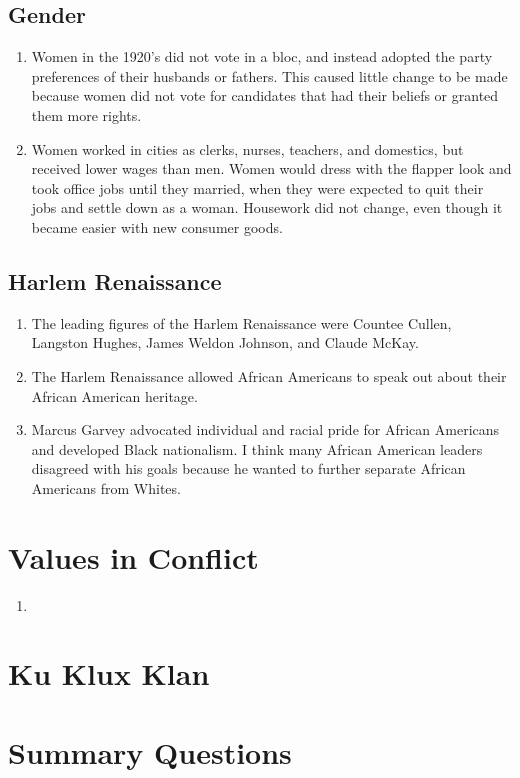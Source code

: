 \documentclass[12pt]{article} %
\begin{document}
\subsection{Gender}
\begin{enumerate}[resume]
	\item Women in the 1920's did not vote in a bloc, and instead adopted the party preferences of their
		husbands or fathers. This caused little change to be made because women did not vote for candidates
		that had their beliefs or granted them more rights.
	\item Women worked in cities as clerks, nurses, teachers, and domestics, but received lower wages than
		men. Women would dress with the flapper look and took office jobs until they married, when they were
		expected to quit their jobs and settle down as a woman. Housework did not change, even though it became
		easier with new consumer goods.
\end{enumerate}
\subsection{Harlem Renaissance}
\begin{enumerate}[resume]
	\item The leading figures of the Harlem Renaissance were Countee Cullen, Langston Hughes, 
		James Weldon Johnson, and Claude McKay.
	\item The Harlem Renaissance allowed African Americans to speak out about their African American heritage.
	\item Marcus Garvey advocated individual and racial pride for African Americans and developed Black nationalism.
		I think many African American leaders disagreed with his goals because he wanted to further separate 
		African Americans from Whites.
\end{enumerate}

\section{Values in Conflict}
\begin{enumerate}
	\item 
\end{enumerate}

\section{Ku Klux Klan}

\section{Summary Questions}
\end{document}
